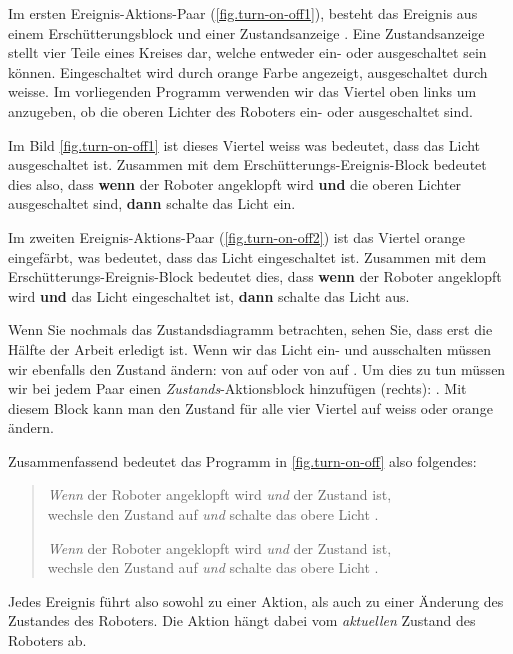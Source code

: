 Im ersten Ereignis-Aktions-Paar (\cref{fig.turn-on-off1}), besteht das Ereignis aus einem Erschütterungsblock und einer Zustandsanzeige . Eine Zustandsanzeige stellt vier Teile eines Kreises dar, welche entweder ein- oder ausgeschaltet sein können. Eingeschaltet wird durch orange Farbe angezeigt, ausgeschaltet durch weisse. Im vorliegenden Programm verwenden wir das Viertel oben links um anzugeben, ob die oberen Lichter des Roboters ein- oder ausgeschaltet sind. 

Im Bild \cref{fig.turn-on-off1} ist dieses Viertel weiss was bedeutet, dass das Licht ausgeschaltet ist. Zusammen mit dem Erschütterungs-Ereignis-Block bedeutet dies also, dass \textbf{wenn} der Roboter angeklopft wird \textbf{und} die oberen Lichter ausgeschaltet sind, \textbf{dann} schalte das Licht ein.

Im zweiten Ereignis-Aktions-Paar (\cref{fig.turn-on-off2}) ist das Viertel orange eingefärbt, was bedeutet, dass das Licht eingeschaltet ist. Zusammen mit dem Erschütterungs-Ereignis-Block bedeutet dies, dass \textbf{wenn} der Roboter angeklopft wird \textbf{und} das Licht eingeschaltet ist, \textbf{dann} schalte das Licht aus.

Wenn Sie nochmals das Zustandsdiagramm betrachten, sehen Sie, dass erst die Hälfte der Arbeit erledigt ist. Wenn wir das Licht ein- und ausschalten müssen wir ebenfalls den Zustand ändern: von  auf  oder von  auf . Um dies zu tun müssen wir bei jedem Paar einen \emph{Zustands}-Aktionsblock hinzufügen (rechts):  
. Mit diesem Block kann man den Zustand für alle vier Viertel auf weiss oder orange ändern. 

Zusammenfassend bedeutet das Programm in \cref{fig.turn-on-off} also folgendes: 

\begin{quote}
	\emph{Wenn} der Roboter angeklopft wird \emph{und} der Zustand  ist,\\
	wechsle den Zustand auf  \emph{und} schalte das obere Licht .
	
	\emph{Wenn} der Roboter angeklopft wird \emph{und} der Zustand  ist,\\
	wechsle den Zustand auf  \emph{und} schalte das obere Licht .
\end{quote}

Jedes Ereignis führt also sowohl zu einer Aktion, als auch zu einer Änderung des Zustandes des Roboters. Die Aktion hängt dabei vom \emph{aktuellen} Zustand des Roboters ab.

